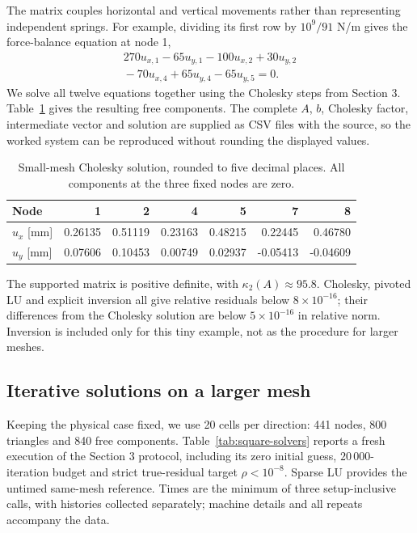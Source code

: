 The matrix couples horizontal and vertical movements rather than
representing independent springs. For example, dividing its first row
by $10^9/91$ N/m gives the force-balance equation at node 1,
\begin{equation}
 \begin{split}
 270u_{x,1}-65u_{y,1}-100u_{x,2}+30u_{y,2}\\
 {}-70u_{x,4}+65u_{y,4}-65u_{y,5}=0.
 \end{split}
 \label{eq:square-row}
\end{equation}
We solve all twelve equations together using the Cholesky steps from
Section 3. Table~\ref{tab:square-small} gives the resulting free
components. The complete $A$, $b$, Cholesky factor, intermediate vector
and solution are supplied as CSV files with the source, so the worked
system can be reproduced without rounding the displayed values.

\begin{table}[htbp]
 \centering
 \caption{Small-mesh Cholesky solution, rounded to five decimal places.
 All components at the three fixed nodes are zero.}
 \label{tab:square-small}
 \begin{tabular}{lrrrrrr}
 \toprule
 Node & 1 & 2 & 4 & 5 & 7 & 8\\
 \midrule
 $u_x$ [mm] & 0.26135 & 0.51119 & 0.23163 & 0.48215 & 0.22445 & 0.46780\\
 $u_y$ [mm] & 0.07606 & 0.10453 & 0.00749 & 0.02937 & -0.05413 & -0.04609\\
 \bottomrule
 \end{tabular}
\end{table}

The supported matrix is positive definite, with $\kappa_2(A)\approx95.8$.
Cholesky, pivoted LU and explicit inversion all give relative residuals
below $8\times10^{-16}$; their differences from the Cholesky solution
are below $5\times10^{-16}$ in relative norm. Inversion is included
only for this tiny example, not as the procedure for larger meshes.

\subsection{Iterative solutions on a larger mesh}
Keeping the physical case fixed, we use 20 cells per direction: 441
nodes, 800 triangles and 840 free components. Table~\ref{tab:square-solvers}
reports a fresh execution of the Section 3 protocol, including its
zero initial guess, $20\,000$-iteration budget and strict true-residual
target $\rho<10^{-8}$. Sparse LU provides the untimed same-mesh
reference. Times are the minimum of three setup-inclusive calls, with
histories collected separately; machine details and all repeats
accompany the data.

